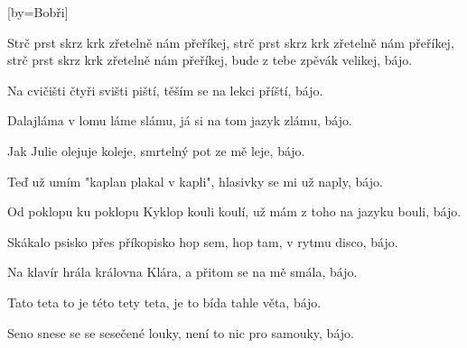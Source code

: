 [by={Bobři}]

\beginchorus{}
Strč prst skrz krk zřetelně nám přeříkej,
strč prst skrz krk zřetelně nám přeříkej,
strč prst skrz krk zřetelně nám přeříkej,
bude z tebe zpěvák velikej, bájo.
\endchorus{}

\beginverse{}
Na cvičišti čtyři svišti piští,
těším se na lekci příští, bájo.
\endverse{}

\beginverse{}
Dalajláma v lomu láme slámu,
já si na tom jazyk zlámu, bájo.
\endverse{}

\beginverse{}
Jak Julie olejuje koleje,
smrtelný pot ze mě leje, bájo.
\endverse{}

\beginverse{}
Teď už umím "kaplan plakal v kapli",
hlasivky se mi už naply, bájo.
\endverse{}

\beginverse{}
Od poklopu ku poklopu Kyklop kouli koulí,
už mám z toho na jazyku bouli, bájo.
\endverse{}

\beginverse{}
Skákalo psisko přes příkopisko
hop sem, hop tam, v rytmu disco, bájo.
\endverse{}

\beginverse{}
Na klavír hrála královna Klára,
a přitom se na mě smála, bájo.
\endverse{}

\beginverse{}
Tato teta to je této tety teta,
je to bída tahle věta, bájo.
\endverse{}

\beginverse{}
Seno snese se se sesečené louky,
není to nic pro samouky, bájo.
\endverse{}

\endsong{}
